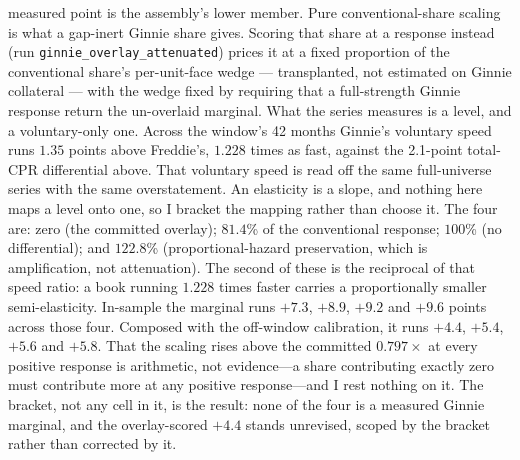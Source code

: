 \documentclass[12pt]{article}
\begin{document}
measured point is the assembly's lower member. Pure conventional-share scaling is what a gap-inert Ginnie share gives. Scoring that share at a response instead (run \texttt{ginnie\_overlay\_attenuated}) prices it at a fixed proportion of the conventional share's per-unit-face wedge --- transplanted, not estimated on Ginnie collateral --- with the wedge fixed by requiring that a full-strength Ginnie response return the un-overlaid marginal. What the series measures is a level, and a voluntary-only one. Across the window's 42 months Ginnie's voluntary speed runs $1.35$ points above Freddie's, $1.228$ times as fast, against the 2.1-point total-CPR differential above. That voluntary speed is read off the same full-universe series with the same overstatement. An elasticity is a slope, and nothing here maps a level onto one, so I bracket the mapping rather than choose it. The four are: zero (the committed overlay); $81.4$\% of the conventional response; $100$\% (no differential); and $122.8$\% (proportional-hazard preservation, which is amplification, not attenuation). The second of these is the reciprocal of that speed ratio: a book running $1.228$ times faster carries a proportionally smaller semi-elasticity. In-sample the marginal runs $+7.3$, $+8.9$, $+9.2$ and $+9.6$ points across those four. Composed with the off-window calibration, it runs $+4.4$, $+5.4$, $+5.6$ and $+5.8$. That the scaling rises above the committed $0.797\times$ at every positive response is arithmetic, not evidence---a share contributing exactly zero must contribute more at any positive response---and I rest nothing on it. The bracket, not any cell in it, is the result: none of the four is a measured Ginnie marginal, and the overlay-scored $+4.4$ stands unrevised, scoped by the bracket rather than corrected by it.
\end{document}
